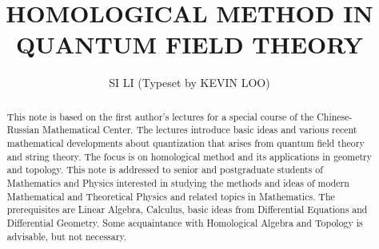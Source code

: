 \documentclass[11pt,twoside]{article}
\title{\bf HOMOLOGICAL METHOD IN QUANTUM FIELD THEORY}
\author{SI LI (Typeset by KEVIN LOO)}
\date{}
\begin{document}
\maketitle
\thispagestyle{empty}

\begin{abstract}
This note is based on the first author's lectures for a special course of the Chinese-Russian Mathematical Center. The lectures introduce basic ideas and various recent mathematical developments about quantization that arises from quantum field theory and string theory. The focus is on homological method and its applications in geometry and topology.
This note is addressed to senior and postgraduate students of Mathematics and Physics interested in studying the methods and ideas of modern Mathematical and Theoretical Physics and related topics in Mathematics. The prerequisites are Linear Algebra, Calculus, basic ideas from Differential Equations and Differential Geometry. Some acquaintance with Homological Algebra and Topology is advisable, but not necessary.
\end{abstract}

\tableofcontents

\newpage
\setcounter{page}{1}











\newpage


\end{document}
